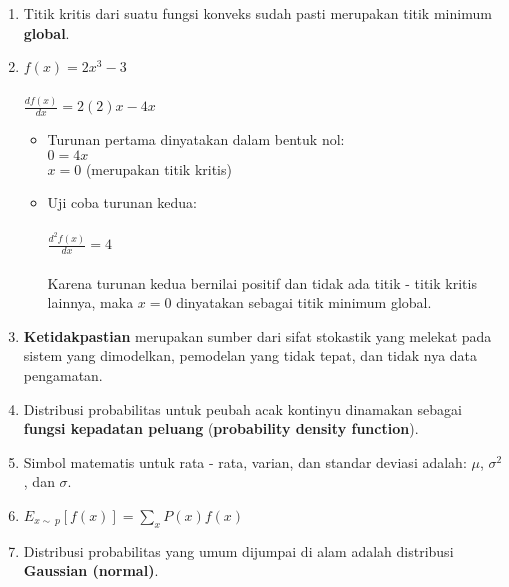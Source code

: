 \begin{enumerate}
\item Titik kritis dari suatu fungsi konveks sudah pasti merupakan titik minimum \textbf{global}. 
\item 
$f(x) = 2x^{3} -3$\\\\
$\frac{df(x)}{dx} = 2(2)x - 4x$\\
\begin{itemize}
\item Turunan pertama dinyatakan dalam bentuk nol:\\
$0 = 4x$\\
$x = 0$ (merupakan titik kritis)
\item Uji coba turunan kedua:\\\\
$\frac{d^{2}f(x)}{dx} = 4$\\\\
Karena turunan kedua bernilai positif dan tidak ada titik - titik kritis lainnya, maka $x=0$ dinyatakan sebagai titik minimum global.
\end{itemize}
\item \textbf{Ketidakpastian} merupakan sumber dari sifat stokastik yang melekat pada sistem yang dimodelkan, pemodelan yang tidak tepat, dan tidak nya data pengamatan.
\item Distribusi probabilitas untuk peubah acak kontinyu dinamakan sebagai \textbf{fungsi kepadatan peluang} (\textbf{probability density function}).
\item Simbol matematis untuk rata - rata, varian, dan standar deviasi adalah: $\mu$, $\sigma^2$, dan $\sigma$.
\item $	E_{x \sim\ p}\left[f(x)\right] = \sum_{x} P(x)f(x)$
\item Distribusi probabilitas yang umum dijumpai di alam adalah distribusi \textbf{Gaussian (normal)}.
\end{enumerate}